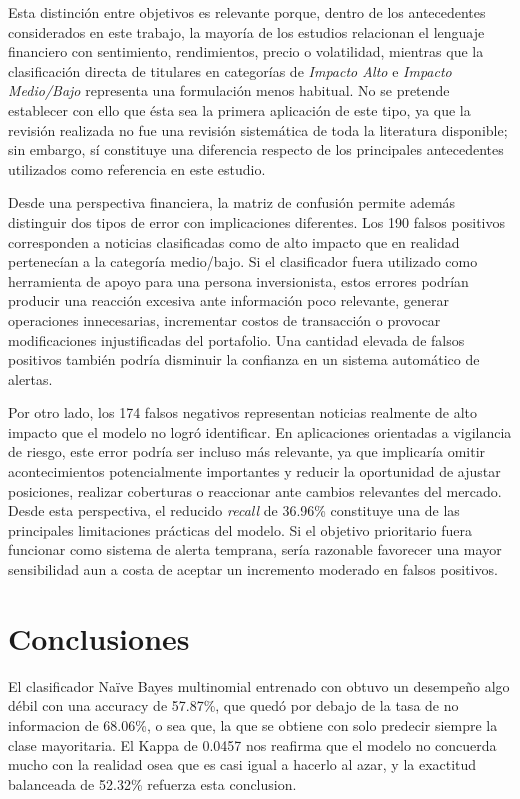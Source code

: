 \documentclass{Academic}
\begin{document}
Esta distinción entre objetivos es relevante porque, dentro de los antecedentes considerados en este 
trabajo, la mayoría de los estudios relacionan el lenguaje financiero con sentimiento, 
rendimientos, precio o volatilidad, mientras que la clasificación directa de titulares en 
categorías de \textit{Impacto Alto} e \textit{Impacto Medio/Bajo} representa una formulación menos 
habitual. No se pretende establecer con ello que ésta sea la primera aplicación de este tipo, ya que 
la revisión realizada no fue una revisión sistemática de toda la literatura disponible; sin embargo, 
sí constituye una diferencia respecto de los principales antecedentes utilizados como referencia en este estudio.

Desde una perspectiva financiera, la matriz de confusión permite además distinguir dos tipos de error 
con implicaciones diferentes. Los 190 falsos positivos corresponden a noticias clasificadas como de alto 
impacto que en realidad pertenecían a la categoría medio/bajo. Si el clasificador fuera utilizado como 
herramienta de apoyo para una persona inversionista, estos errores podrían producir una reacción excesiva 
ante información poco relevante, generar operaciones innecesarias, incrementar costos de transacción o 
provocar modificaciones injustificadas del portafolio. Una cantidad elevada de falsos positivos también 
podría disminuir la confianza en un sistema automático de alertas.

Por otro lado, los 174 falsos negativos representan noticias realmente de alto impacto que el modelo 
no logró identificar. En aplicaciones orientadas a vigilancia de riesgo, este error podría ser incluso 
más relevante, ya que implicaría omitir acontecimientos potencialmente importantes y reducir la oportunidad 
de ajustar posiciones, realizar coberturas o reaccionar ante cambios relevantes del mercado. Desde esta 
perspectiva, el reducido \textit{recall} de 36.96\% constituye una de las principales limitaciones 
prácticas del modelo. Si el objetivo prioritario fuera funcionar como sistema de alerta temprana, 
sería razonable favorecer una mayor sensibilidad aun a costa de aceptar un incremento moderado 
en falsos positivos.





\section{Conclusiones}

El clasificador Naïve Bayes multinomial entrenado con obtuvo un desempeño algo débil con una accuracy de 57.87\%,
que quedó por debajo de la tasa de no informacion de 68.06\%, o sea que, la que se obtiene con solo predecir siempre
la clase mayoritaria. El Kappa de 0.0457 nos reafirma que el modelo no concuerda mucho con la realidad osea que
es casi igual a hacerlo al azar, y la exactitud balanceada de 52.32\% refuerza esta conclusion.
\end{document}
